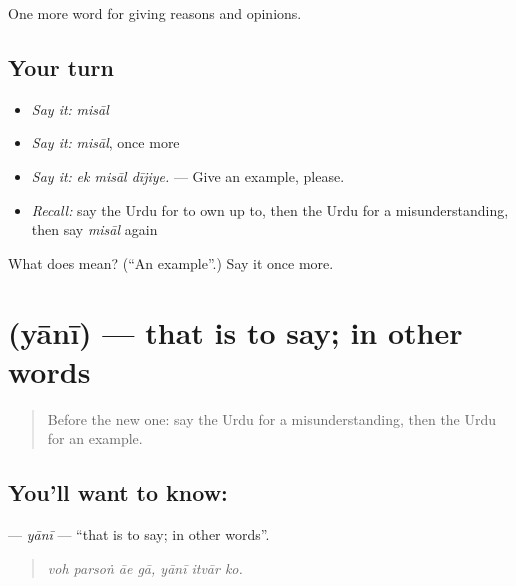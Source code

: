 \begin{grammarlens}[title={What you've built}]
One more word for giving reasons and opinions.
\end{grammarlens}

\subsection*{Your turn}
\begin{itemize}
\raggedright
  \item \emph{Say it:} \emph{misāl}
  \item \emph{Say it:} \emph{misāl}, once more
  \item \emph{Say it:} \emph{ek misāl dījiye.} — Give an example, please.
  \item \emph{Recall:} say the Urdu for to own up to, then the Urdu for a misunderstanding, then say \emph{misāl} again
\end{itemize}

\begin{tcolorbox}[breakable,colback=teal!4,colframe=teal!35!black,title={Before you move on}]
What does  mean? (\textquotedblleft{}An example\textquotedblright{}.) Say it once more.
\end{tcolorbox}
\section[\texorpdfstring{\ur{یعنی} (yānī)}{یعنی (yānī)}]{ (yānī) — that is to say; in other words}

\label{lesson:UR-C338-yani}



\begin{quote}
Before the new one: say the Urdu for a misunderstanding, then the Urdu for an example.
\end{quote}

\subsection*{You'll want to know: }
\textbf{} — \emph{yānī} — \textquotedblleft{}that is to say; in other words\textquotedblright{}.

\begin{quote}
      
\end{quote}

\begin{quote}
\emph{voh parsoṅ āe gā, yānī itvār ko.}
\end{quote}

